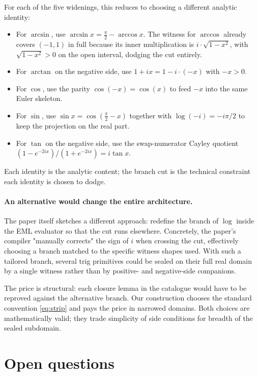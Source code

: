 \documentclass[11pt]{article}
\theoremstyle{plain}
\theoremstyle{definition}
\begin{document}
For each of the five widenings, this reduces to choosing a different
analytic identity:
\begin{itemize}[topsep=2pt, itemsep=2pt]
  \item For $\arcsin$, use $\arcsin x = \tfrac{\pi}{2} - \arccos x$.
    The witness for $\arccos$ already covers $(-1, 1)$ in full because
    its inner multiplication is $i \cdot \sqrt{1 - x^2}$, with
    $\sqrt{1-x^2} > 0$ on the open interval, dodging the cut entirely.
  \item For $\arctan$ on the negative side, use $1 + ix = 1 - i\cdot(-x)$
    with $-x > 0$.
  \item For $\cos$, use the parity $\cos(-x) = \cos(x)$ to feed $-x$
    into the same Euler skeleton.
  \item For $\sin$, use $\sin x = \cos(\tfrac{\pi}{2} - x)$ together
    with $\log(-i) = -i\pi/2$ to keep the projection on the real part.
  \item For $\tan$ on the negative side, use the swap-numerator Cayley
    quotient $(1 - e^{-2ix}) / (1 + e^{-2ix}) = i\tan x$.
\end{itemize}
Each identity is the analytic content; the branch cut is the technical
constraint each identity is chosen to dodge.

\paragraph{An alternative would change the entire architecture.}
The paper itself sketches a different approach: redefine the branch
of $\log$ inside the EML evaluator so that the cut runs elsewhere.
Concretely, the paper's compiler "manually corrects" the sign of $i$
when crossing the cut, effectively choosing a branch matched to the
specific witness shapes used. With such a tailored branch, several
trig primitives could be sealed on their full real domain by a single
witness rather than by positive- and negative-side companions.

The price is structural: each closure lemma in the catalogue would
have to be reproved against the alternative branch. Our construction
chooses the standard convention \eqref{eq:strip} and pays the price
in narrowed domains. Both choices are mathematically valid; they
trade simplicity of side conditions for breadth of the sealed
subdomain.

\section{Open questions}
\label{sec:open}
\end{document}
